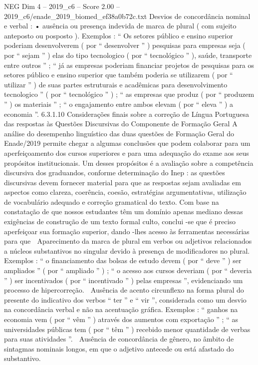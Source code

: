 \begin{textsample}{NEG Dim 4 – 2019\_c6 – Score 2.00 – 2019\_c6/enade\_2019\_biomed\_ef38a0b72c.txt}
Desvios de concordância nominal e verbal : • ausência ou presença indevida de marca de plural ( com sujeito anteposto ou posposto ).
Exemplos : “ Os setores público e ensino superior poderiam desenvolverem ( por “ desenvolver ” ) pesquisas para empresas seja ( por “ sejam ” ) elas do tipo tecnologico ( por “ tecnológico ” ), saúde, transporte entre outros ” ; “ já as empresas poderiam financiar projetos de pesquisas para os setores público e ensino superior que também poderia se utilizarem ( por “ utilizar ” ) de suas partes estruturais e acadêmicas para desenvolvimento tecnologico ” ( por “ tecnológico ” ) ; “ as empresas que produz ( por “ produzem ” ) os materiais ” ; “ o engajamento entre ambos elevam ( por “ eleva ” ) a economia ”. 6.3.1.10 Considerações finais sobre a correção de Língua Portuguesa das respostas às Questões Discursivas do Componente de Formação Geral A análise do desempenho linguístico das duas questões de Formação Geral do Enade/2019 permite chegar a algumas conclusões que podem colaborar para um aperfeiçoamento dos cursos superiores e para uma adequação do exame aos seus propósitos institucionais.
Um desses propósitos é a avaliação sobre a competência discursiva dos graduandos, conforme determinação do Inep : as questões discursivas devem fornecer material para que as respostas sejam avaliadas em aspectos como clareza, coerência, coesão, estratégias argumentativas, utilização de vocabulário adequado e correção gramatical do texto.
Com base na constatação de que nossos estudantes têm um domínio apenas mediano dessas exigências de construção de um texto formal culto, conclui -se que é preciso aperfeiçoar sua formação superior, dando -lhes acesso às ferramentas necessárias para que  Aparecimento da marca de plural em verbos ou adjetivos relacionados a núcleos substantivos no singular devido à presença de modificadores no plural.
Exemplos : “ o financiamento das bolsas de estudo devem ( por “ deve ” ) ser ampliados ” ( por “ ampliado ” ) ; “ o acesso aos cursos deveriam ( por “ deveria ” ) ser incentivados ( por “ incentivado ” ) pelas empresas ”, evidenciando um processo de hipercorreção.  Ausência de acento circunflexo na forma plural do presente do indicativo dos verbos “ ter ” e “ vir ”, considerada como um desvio na concordância verbal e não na acentuação gráfica.
Exemplos : “ ganhos na economia vem ( por “ vêm ” ) através dos aumentos com exportação ” ; “ as universidades públicas tem ( por “ têm ” ) recebido menor quantidade de verbas para suas atividades ”.  Ausência de concordância de gênero, no âmbito de sintagmas nominais longos, em que o adjetivo antecede ou está afastado do substantivo.

\end{textsample}
